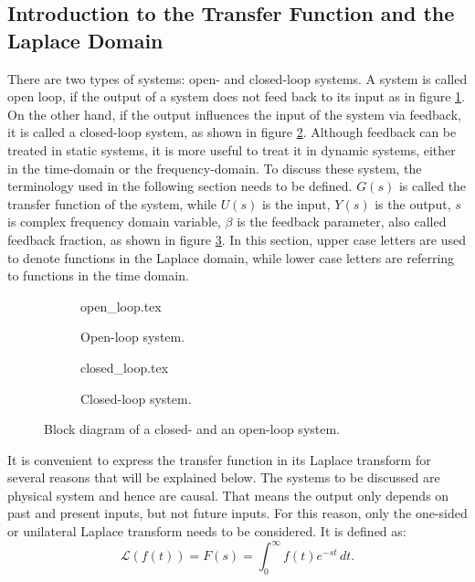 \subsection{Introduction to the Transfer Function and the Laplace Domain}%
\label{sec:transfer_function}
There are two types of systems: open- and closed-loop systems. A system is called open loop, if the output of a system does not feed back to its input as in figure \ref{fig:open_loop}. On the other hand, if the output influences the input of the system via feedback, it is called a closed-loop system, as shown in figure \ref{fig:closed_loop}. Although feedback can be treated in static systems, it is more useful to treat it in dynamic systems, either in the time-domain or the frequency-domain. To discuss these system, the terminology used in the following section needs to be defined. $G(s)$ is called the transfer function of the system, while $U(s)$ is the input, $Y(s)$ is the output, $s$ is  complex frequency domain variable, $\beta$ is the feedback parameter, also called feedback fraction, as shown in figure \ref{fig:feedback_systems}. In this section, upper case letters are used to denote functions in the Laplace domain, while lower case letters are referring to functions in the time domain.
\begin{figure}[ht]
    \centering
    \begin{subfigure}{0.4\linewidth}
        \centering
        {open_loop.tex}
        \caption{Open-loop system.}
        \label{fig:open_loop}
    \end{subfigure}
    \begin{subfigure}{0.4\linewidth}
        \centering
        {closed_loop.tex}
        \caption{Closed-loop system.}
        \label{fig:closed_loop}
    \end{subfigure}
    \caption{Block diagram of a closed- and an open-loop system.}
    \label{fig:feedback_systems}
\end{figure}

It is convenient to express the transfer function in its Laplace transform for several reasons that will be explained below. The systems to be discussed are physical system and hence are causal. That means the output only depends on past and present inputs, but not future inputs. For this reason, only the one-sided or unilateral Laplace transform needs to be considered. It is defined as:
\begin{equation}
    \mathscr{L}\left( f(t) \right) = F(s) = \int_0^\infty f(t) e^{-st}\,dt.
\end{equation}

